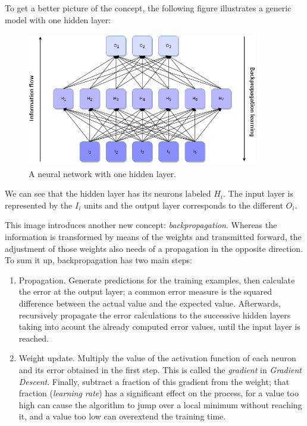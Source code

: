 \newpage

	To get a better picture of the concept, the following figure illustrates a generic model with one hidden layer:

	\vspace{0.2cm}

	\begin{figure}[bth]

        \myfloatalign
        \includegraphics[width=0.9\textwidth]{gfx/NeuralNetwork.png}
        \caption{A neural network with one hidden layer.}

    \end{figure}

    We can see that the hidden layer has its neurons labeled $H_i$. The input layer is represented by the $I_i$ units and the output layer corresponds to the different $O_i$. 

    This image introduces another new concept: \textit{backpropagation}. Whereas the information is transformed by means of the weights and transmitted forward, the adjustment of those weights also needs of a propagation in the opposite direction. To sum it up, backpropagation has two main steps:

    \begin{enumerate}

    	\item
    	Propagation. Generate predictions for the training examples, then calculate the error at the output layer; a common error measure is the squared difference between the actual value and the expected value. Afterwards, recursively propagate the error calculations to the successive hidden layers taking into acount the already computed error values, until the input layer is reached.

    	\item
    	Weight update. Multiply the value of the activation function of each neuron and its error obtained in the first step. This is called the \textit{gradient} in \textit{Gradient Descent}. Finally, subtract a fraction of this gradient from the weight; that fraction (\textit{learning rate}) has a significant effect on the process, for a value too high can cause the algorithm to jump over a local minimum without reaching it, and a value too low can overextend the training time.

    \end{enumerate}

